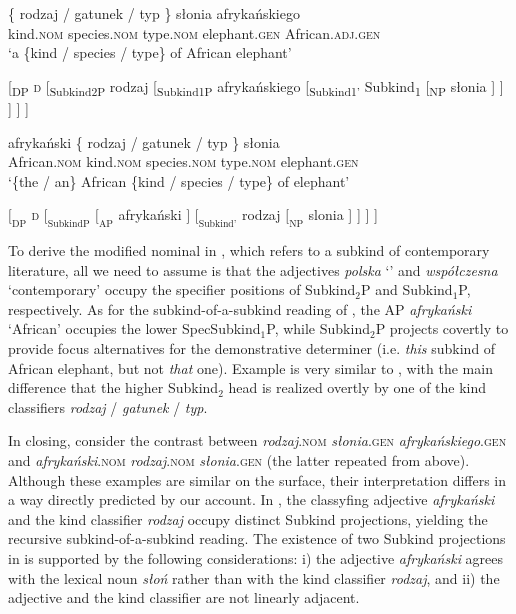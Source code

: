 \documentclass[output=paper]{langscibook}
\begin{document}
\ea \label{ex:recursive_3}
\ea \gll
\{ rodzaj / gatunek / typ \} słonia afrykańskiego\\
{ } kind.\textsc{nom} { } species.\textsc{nom} { } type.\textsc{nom} { } elephant.\textsc{gen} African.\textsc{adj}.\textsc{gen}\\
\glt `a \{kind / species / type\} of African elephant'

\ex
{}[\textsubscript{DP} \textsc{d} [\textsubscript{Subkind2P} rodzaj [\textsubscript{Subkind1P} afrykańskiego [\textsubscript{Subkind1'} Subkind\textsubscript{1} [\textsubscript{NP} słonia ] ] ] ] ]
\z \z

\ea \label{ex:recursive_4}
\ea \gll
afrykański \{ rodzaj / gatunek / typ \} słonia\\
African.\textsc{nom} { } kind.\textsc{nom} { } species.\textsc{nom} { } type.\textsc{nom} { } elephant.\textsc{gen}\\
\glt `\{the / an\} African \{kind / species / type\} of elephant'

\ex $[_\text{DP}$ \textsc{d} $[_\text{SubkindP}$ $[_\text{AP}$ afrykański $]$ $[_\text{Subkind'}$ rodzaj $[_\text{NP}$ slonia ] ] ] ]
\z \z

\noindent
To derive the modified nominal in , which refers to a subkind of contemporary literature, all we need to assume is that the adjectives \textit{polska}{ }`' and \textit{współczesna}{ }`contemporary' occupy the specifier positions of Subkind$_2$P and Subkind$_1$P, respectively. As for the subkind-of-a-subkind reading of , the AP \textit{afrykański} `African' occupies the lower SpecSubkind$_1$P, while Subkind$_2$P projects covertly to provide focus alternatives for the demonstrative determiner (i.e. \textit{this} subkind of African elephant, but not \textit{that} one). Example  is very similar to , with the main difference that the higher Subkind$_2$ head is realized overtly by one of the kind classifiers \textit{rodzaj} / \textit{gatunek} / \textit{typ}.

In closing, consider the contrast between \textit{rodzaj}.\textsc{nom} \textit{słonia}.\textsc{gen} \textit{afrykańskiego}.\textsc{gen}  and \textit{afrykański}.\textsc{nom} \textit{rodzaj}.\textsc{nom} \textit{słonia}.\textsc{gen}  (the latter repeated from  above). Although these examples are similar on the surface, their interpretation differs in a way directly predicted by our account. In ,  the classyfing adjective \textit{afrykański} and the kind classifier \textit{rodzaj} occupy distinct Subkind projections, yielding the recursive subkind-of-a-subkind reading. The existence of two Subkind projections in  is supported by the following considerations: i) the adjective \textit{afrykański} agrees with the lexical noun \textit{słoń} rather than with the kind classifier \textit{rodzaj}, and ii) the adjective and the kind classifier are not linearly adjacent.
\end{document}
